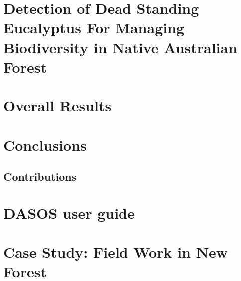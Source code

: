 \documentclass[11pt,nofootinbib]{report}
\begin{document}
	\chapter{Detection of Dead Standing Eucalyptus For Managing Biodiversity in Native Australian Forest}\label{Classifications}
		
		\newpage
	\chapter{Overall Results}\label{Results}
		
		\newpage
	\chapter{Conclusions}\label{Conclusions}
		
		\newpage
		\section{Contributions}\label{Contributions}
		
		
	    
	    {}
        \newpage

   \setcounter{secnumdepth}{4}
  
   	
		\newpage
		\appendix
	\chapter{DASOS user guide}\label{NULL}
%		 	
		\thispagestyle{empty}
		\newpage
		
	\chapter{Case Study: Field Work in New Forest}\label{Fieldwork}
		 
		\newpage
	

    
\end{document}
